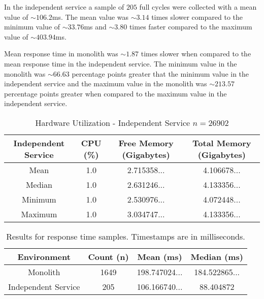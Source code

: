 In the independent service a sample of $205$ full cycles were collected with a mean value of $\sim106.2$ms.
The mean value was $\sim3.14$ times slower compared to the minimum value of $\sim 33.76$ms and $\sim3.80$ times faster compared to the maximum value of $\sim 403.94$ms.

Mean response time in monolith was $\sim1.87$ times slower when compared to the mean response time in the independent service.
The minimum value in the monolith was $\sim 66.63$ percentage points greater that the minimum value in the independent service and the maximum value in the monolith was $\sim 213.57$ percentage points greater when compared to the maximum value in the independent service.

\begin{table}[h!]
       \begin{tabular}{|c|c|c|c|} 
        \hline
        Independent Service
        & CPU (\%)
        & Free Memory (Gigabytes)
        & Total Memory (Gigabytes) \\ [0.5ex] 
        
        \hline\hline
        Mean
        & 1.0
        & 2.715358... 
        & 4.106678...
        \\
        
        Median
        & 1.0
        & 2.631246...
        & 4.133356...
        \\ 

        Minimum
        & 1.0
        & 2.530976...
        & 4.072448...
        \\ 
        
        Maximum
        & 1.0
        & 3.034747...
        & 4.133356...
        \\
        \hline
    \end{tabular}
    \caption{Hardware Utilization - Independent Service $n=26902$}
    \label{table:hardware results:independent service:1}
\end{table}

\begin{table}[h!]
    \begin{tabular}{|c|c|c|c|} 
        \hline
        Environment
        & Count (n)
        & Mean (ms)
        & Median (ms)
        \\ [0.5ex] 
        
        \hline\hline
        Monolith
        & 1649
        & 198.747024...
        & 184.522865...
        \\ 
        
        Independent Service
        & 205
        & 106.166740...
        & 88.404872
        \\
        \hline
    \end{tabular}
    \caption{Results for response time samples. Timestamps are in milliseconds.}
    \label{table:response time results:1}
\end{table}

